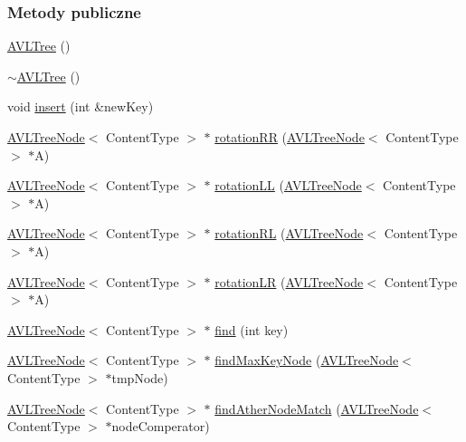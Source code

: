 \subsubsection*{Metody publiczne}
\begin{DoxyCompactItemize}
\item 
\hyperlink{class_a_v_l_tree_ab2eeaf55f5521c4d9d0090b0ea74c92c}{A\-V\-L\-Tree} ()
\item 
\hyperlink{class_a_v_l_tree_a51346b432823dce79badfd69e0a4236c}{$\sim$\-A\-V\-L\-Tree} ()
\item 
void \hyperlink{class_a_v_l_tree_a3a85ff5f0b56af6c8b358611f8de95af}{insert} (int \&new\-Key)
\item 
\hyperlink{class_a_v_l_tree_node}{A\-V\-L\-Tree\-Node}$<$ Content\-Type $>$ $\ast$ \hyperlink{class_a_v_l_tree_a81a6d1f73184e06ad92861b6ec2f96d7}{rotation\-R\-R} (\hyperlink{class_a_v_l_tree_node}{A\-V\-L\-Tree\-Node}$<$ Content\-Type $>$ $\ast$A)
\item 
\hyperlink{class_a_v_l_tree_node}{A\-V\-L\-Tree\-Node}$<$ Content\-Type $>$ $\ast$ \hyperlink{class_a_v_l_tree_a1e0560fa0ca27be07971223df9639b03}{rotation\-L\-L} (\hyperlink{class_a_v_l_tree_node}{A\-V\-L\-Tree\-Node}$<$ Content\-Type $>$ $\ast$A)
\item 
\hyperlink{class_a_v_l_tree_node}{A\-V\-L\-Tree\-Node}$<$ Content\-Type $>$ $\ast$ \hyperlink{class_a_v_l_tree_aae2d0b03656204df27bebda84229b226}{rotation\-R\-L} (\hyperlink{class_a_v_l_tree_node}{A\-V\-L\-Tree\-Node}$<$ Content\-Type $>$ $\ast$A)
\item 
\hyperlink{class_a_v_l_tree_node}{A\-V\-L\-Tree\-Node}$<$ Content\-Type $>$ $\ast$ \hyperlink{class_a_v_l_tree_a5751bfd512b5dfe32060a649f697d5f0}{rotation\-L\-R} (\hyperlink{class_a_v_l_tree_node}{A\-V\-L\-Tree\-Node}$<$ Content\-Type $>$ $\ast$A)
\item 
\hyperlink{class_a_v_l_tree_node}{A\-V\-L\-Tree\-Node}$<$ Content\-Type $>$ $\ast$ \hyperlink{class_a_v_l_tree_aee790e9dba096b0b8077602bccb0f2ca}{find} (int key)
\item 
\hyperlink{class_a_v_l_tree_node}{A\-V\-L\-Tree\-Node}$<$ Content\-Type $>$ $\ast$ \hyperlink{class_a_v_l_tree_a2e7405f8939b072489bb4ffd4521b374}{find\-Max\-Key\-Node} (\hyperlink{class_a_v_l_tree_node}{A\-V\-L\-Tree\-Node}$<$ Content\-Type $>$ $\ast$tmp\-Node)
\item 
\hyperlink{class_a_v_l_tree_node}{A\-V\-L\-Tree\-Node}$<$ Content\-Type $>$ $\ast$ \hyperlink{class_a_v_l_tree_aa776fe15518d516032ca6d4522d77b02}{find\-Ather\-Node\-Match} (\hyperlink{class_a_v_l_tree_node}{A\-V\-L\-Tree\-Node}$<$ Content\-Type $>$ $\ast$node\-Comperator)

\end{DoxyCompactItemize}
